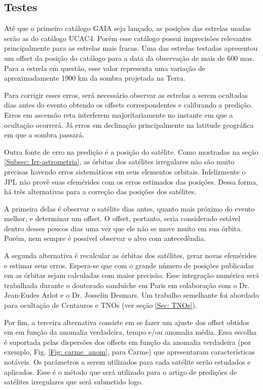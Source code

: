 \documentclass[12pt,a4paper]{monografia}
\begin{document}
\subsection{Testes}
\label{Subsec: Irr-testes}

\indent \indent Até que o primeiro catálogo GAIA seja lançado, as posições das estrelas usadas serão as do catálogo UCAC4. Porém esse catálogo possui imprecisões relevantes principalmente para as estrelas mais fracas. Uma das estrelas testadas apresentou um offset da posição do catálogo para a data da observação de mais de 600 mas. Para a estrela em questão, esse valor representa uma variação de aproximadamente 1900 km da sombra projetada na Terra.

Para corrigir esses erros, será necessário observar as estrelas a serem ocultadas dias antes do evento obtendo os offsets correspondentes e calibrando a predição. Erros em ascensão reta interferem majoritariamente no instante em que a ocultação ocorrerá. Já erros em declinação principalmente na latitude geográfica em que a sombra passará.

Outra fonte de erro na predição é a posição do satélite. Como mostradas na seção \ref{Subsec: Irr-astrometria}, as órbitas dos satélites irregulares não são muito precisas havendo erros sistemáticos em seus elementos orbitais. Infelizmente o JPL não provê suas efemérides com os erros estimados das posições. Dessa forma, há três alternativas para a correção das posições dos satélites.

A primeira delas é observar o satélite dias antes, quanto mais próximo do evento melhor, e determinar um offset. O offset, portanto, seria considerado estável dentro desses poucos dias uma vez que ele não se move muito em sua órbita. Porém, nem sempre é possível observar o alvo com antecedêndia.

A segunda alternativa é recalcular as órbitas dos satélites, gerar novas efemérides e estimar seus erros. Espera-se que com o grande número de posições publicadas em \cite{GomesJunior2015-Irregular} as órbitas sejam calculadas com maior precisão. Esse integração numérica será trabalhada durante o doutorado sanduíche em Paris em colaboração com o Dr. Jean-Eudes Arlot e o Dr. Josselin Desmars. Um trabalho semelhante foi abordado para ocultação de Centauros e TNOs (ver seção \ref{Sec: TNOs}).

Por fim, a terceira alternativa consiste em se fazer um ajuste dos offset obtidos em \cite{GomesJunior2015-Irregular} em função da anomalia verdadeira, tempo e/ou anomalia média. Essa escolha é suportada pelas dispersões dos offsets em função da anomalia verdadeira (por exemplo, Fig. \ref{Fig: carme_anom}, para Carme) que apresentaram características notáveis. Os parâmetros a serem utilizados para cada satélite serão estudados e aplicados. Esse é o método que será utilizado para o artigo de predições de satélites irregulares que será submetido logo.
\end{document}
